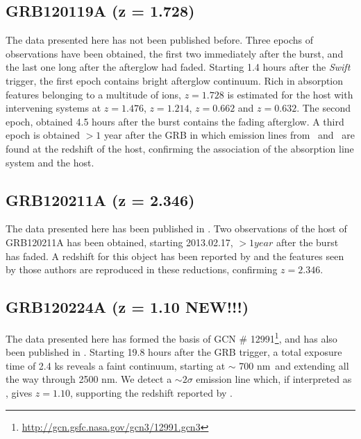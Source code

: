 \documentclass{aa}    %
\begin{document}
\subsection{GRB120119A (z = 1.728)}
The data presented here has not been published before. Three epochs of
observations have been obtained, the first two immediately after the burst, and
the last one long after the afterglow had faded. Starting 1.4 hours after the
\textit{Swift} trigger, the first epoch contains bright afterglow continuum.
Rich in absorption features belonging to a multitude of ions, $z =	1.728$ is
estimated for the host with intervening systems at $z =	1.476$, $z = 1.214$, $z
= 0.662$ and $z = 0.632$. The second epoch, obtained 4.5 hours after the burst
contains the fading afterglow. A third epoch is obtained $>1$ year after the
GRB in which emission lines from \hb~and \ha~are found at the redshift of the
host, confirming the association of the absorption line system and the host.

\subsection{GRB120211A (z = 2.346)}
The data presented here has been published in \citet{Kruhler2015}. Two
observations of the host of GRB120211A has been obtained, starting 2013.02.17,
$> 1 year$ after the burst has faded. A redshift for this object has been
reported by \citet{Kruhler2015} and the features seen by those authors are
reproduced in these reductions, confirming $z =	2.346$.

\subsection{GRB120224A (z = 1.10 NEW!!!)}
The data presented here has formed the basis of GCN \#
12991\footnote{\url{http://gcn.gsfc.nasa.gov/gcn3/12991.gcn3}}, and has also
been published in \citet{Kruhler2015}. Starting 19.8 hours after the GRB
trigger, a total exposure time of 2.4 ks reveals a faint continuum, starting at
$\sim$ 700 nm~and extending all the way through 2500 nm. We detect a $\sim
2 \sigma$ emission line which, if interpreted as \ha, gives $z = 1.10$,
supporting the redshift reported by \citet{Kruhler2015}.
\end{document}
